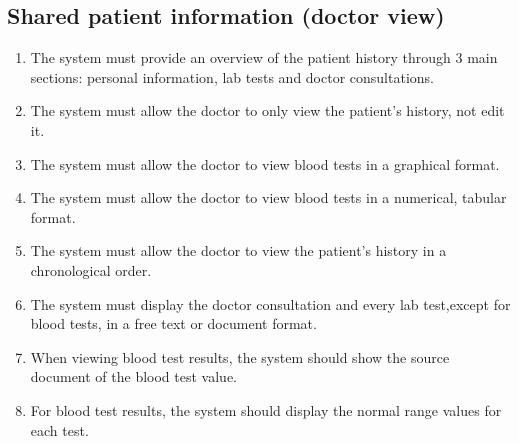 \subsection{Shared patient information (doctor view)}
\begin{enumerate}
    \item The system must provide an overview of the patient history through 3 main sections: personal information, lab tests and doctor consultations.
    \item The system must allow the doctor to only view the patient's history, not edit it.
    \item The system must allow the doctor to view blood tests in a graphical format.
    \item The system must allow the doctor to view blood tests in a numerical, tabular format.
    \item The system must allow the doctor to view the patient's history in a chronological order.
    \item The system must display the doctor consultation and every lab test,except for blood tests, in a free text or document format.
    \item When viewing blood test results, the system should show the source document of the blood test value.
    \item For blood test results, the system should display the normal range values for each test.
\end{enumerate}

